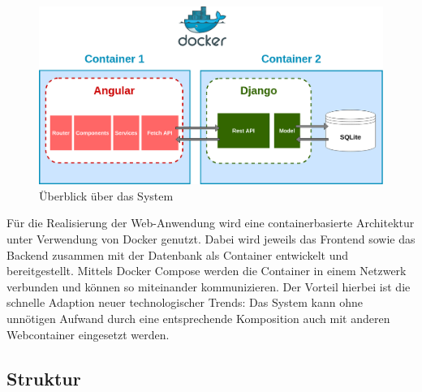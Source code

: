 \documentclass[conference]{IEEEtran}
\begin{document}
\begin{figure}[!h]
	\centering
	\includegraphics[width=0.9\columnwidth]{./figures/architecture_with_docker}
	\caption{Überblick über das System}
\end{figure}
Für die Realisierung der Web-Anwendung wird eine containerbasierte Architektur unter Verwendung von Docker genutzt. Dabei wird jeweils das Frontend sowie das Backend zusammen mit der Datenbank als Container entwickelt und bereitgestellt. Mittels Docker Compose werden die Container in einem Netzwerk verbunden und können so miteinander kommunizieren. Der Vorteil hierbei ist die schnelle Adaption neuer technologischer Trends: Das System kann ohne unnötigen Aufwand durch eine entsprechende Komposition auch mit anderen Webcontainer eingesetzt werden.
\pagebreak

\subsection{Struktur}\label{structure}
\end{document}
